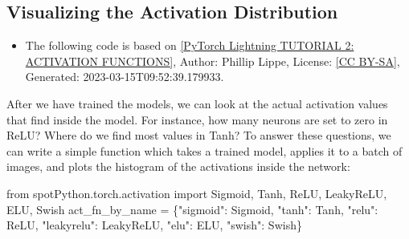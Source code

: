 \documentclass[
  letterpaper,
  DIV=11,
  numbers=noendperiod]{scrreprt}
\newenvironment{Shaded}{\begin{snugshade}}{\end{snugshade}}
\newcommand{\ImportTok}[1]{\textcolor[rgb]{0.00,0.46,0.62}{#1}}
\newcommand{\NormalTok}[1]{\textcolor[rgb]{0.00,0.23,0.31}{#1}}
\newcommand{\OperatorTok}[1]{\textcolor[rgb]{0.37,0.37,0.37}{#1}}
\newcommand{\StringTok}[1]{\textcolor[rgb]{0.13,0.47,0.30}{#1}}
\providecommand{\tightlist}{%
  \setlength{\itemsep}{0pt}\setlength{\parskip}{0pt}}\usepackage{longtable,booktabs,array}
\begin{document}
\hypertarget{visualizing-the-activation-distribution}{%
\subsection{Visualizing the Activation
Distribution}\label{visualizing-the-activation-distribution}}

\begin{tcolorbox}[enhanced jigsaw, left=2mm, title=\textcolor{quarto-callout-note-color}{\faInfo}\hspace{0.5em}{Reference:}, bottomrule=.15mm, titlerule=0mm, breakable, rightrule=.15mm, toprule=.15mm, coltitle=black, colbacktitle=quarto-callout-note-color!10!white, leftrule=.75mm, arc=.35mm, colframe=quarto-callout-note-color-frame, bottomtitle=1mm, colback=white, opacitybacktitle=0.6, toptitle=1mm, opacityback=0]

\begin{itemize}
\tightlist
\item
  The following code is based on
  \href{https://lightning.ai/docs/pytorch/stable/notebooks/course_UvA-DL/02-activation-functions.html}{{[}PyTorch
  Lightning TUTORIAL 2: ACTIVATION FUNCTIONS{]}}, Author: Phillip Lippe,
  License: \href{https://creativecommons.org/licenses/by-sa/3.0/}{{[}CC
  BY-SA{]}}, Generated: 2023-03-15T09:52:39.179933.
\end{itemize}

\end{tcolorbox}

After we have trained the models, we can look at the actual activation
values that find inside the model. For instance, how many neurons are
set to zero in ReLU? Where do we find most values in Tanh? To answer
these questions, we can write a simple function which takes a trained
model, applies it to a batch of images, and plots the histogram of the
activations inside the network:

\begin{Shaded}
\begin{Highlighting}[]
\ImportTok{from}\NormalTok{ spotPython.torch.activation }\ImportTok{import}\NormalTok{ Sigmoid, Tanh, ReLU, LeakyReLU, ELU, Swish}
\NormalTok{act\_fn\_by\_name }\OperatorTok{=}\NormalTok{ \{}\StringTok{"sigmoid"}\NormalTok{: Sigmoid, }\StringTok{"tanh"}\NormalTok{: Tanh, }\StringTok{"relu"}\NormalTok{: ReLU, }\StringTok{"leakyrelu"}\NormalTok{: LeakyReLU, }\StringTok{"elu"}\NormalTok{: ELU, }\StringTok{"swish"}\NormalTok{: Swish\}}
\end{Highlighting}
\end{Shaded}
\end{document}
